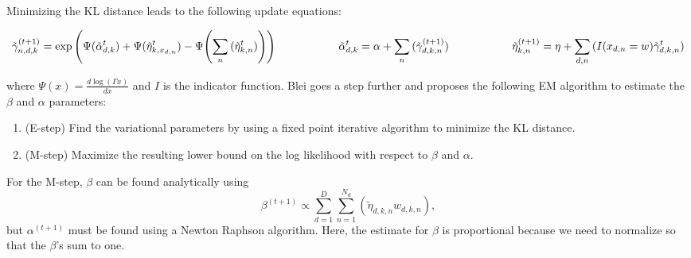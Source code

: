 \documentclass[3p,times]{elsarticle}
\begin{document}
Minimizing the KL distance leads to the following update equations:

\begin{equation} \label{eq6}
\tilde{\gamma}^{(t+1)}_{n,d,k}=\exp{\left(\Psi{(\tilde{\alpha}^{t}_{d,k})}+\Psi{(\tilde{\eta}^{t}_{k,x_{d,n}})}-\Psi{\left(\sum_{n}{(\tilde{\eta}^{t}_{k,n})}\right)}\right)} \hspace{20mm} \tilde{\alpha}^{t}_{d,k}=\alpha+\sum_{n}{(\tilde{\gamma}^{(t+1)}_{d,k,n})} \hspace{20mm} \tilde{\eta}^{(t+1)}_{k,n}=\eta+\sum_{d,n}{(I(x_{d,n}=w)\tilde{\gamma}^{t}_{d,k,n})} 
\end{equation}

where $\Psi(x)=\frac{d\log{(\Gamma{x} ) } }{dx}$ and $I$ is the indicator function. Blei goes a step further and proposes the following EM algorithm to estimate the $\beta$ and $\alpha$ parameters:

\begin{enumerate}
	\item (E-step) Find the variational parameters by using a fixed point iterative algorithm to minimize the KL distance.
	\item (M-step) Maximize the resulting lower bound on the log likelihood with respect to $\beta$ and $\alpha$.
\end{enumerate}  

For the M-step, $\beta$ can be found analytically using 
\begin{equation} \label{eq7}
\beta^{(t+1)} \propto \sum_{d=1}^{D}\sum_{n=1}^{N_{d}}{(\tilde{\eta}_{d,k,n}w_{d,k,n})},
\end{equation} 
but $\alpha^{(t+1)}$ must be found using a Newton Raphson algorithm. Here, the estimate for $\beta$ is proportional because we need to normalize so that the $\beta$'s sum to one.
\end{document}
